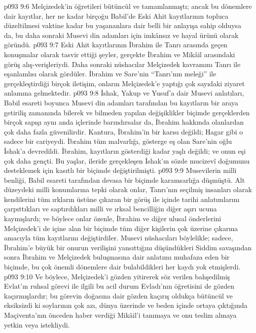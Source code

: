 \vs p093 9:6 Melçizedek’in öğretileri bütüncül ve tamamlanmıştı; ancak bu dönemlere dair kayıtlar, her ne kadar birçoğu Babil’de Eski Ahit kayıtlarının topluca düzeltilmesi vaktine kadar bu yaşananlara dair belli bir anlayışa sahip olduysa da, bu daha sonraki Musevi din adamları için imkânsız ve hayal ürünü olarak göründü.
\vs p093 9:7 Eski Ahit kayıtlarının İbrahim ile Tanrı arasında geçen konuşmalar olarak tasvir ettiği şeyler, gerçekte İbrahim ve Mikâil arasındaki görüş alış\hyp{}verişleriydi. Daha sonraki nüshacılar Melçizedek kavramını Tanrı ile eşanlamlısı olarak gördüler. İbrahim ve Sare’nin “Tanrı’nın meleği” ile gerçekleştirdiği birçok iletişim, onların Melçizedek’e yaptığı çok sayıdaki ziyaret anlamına gelmektedir.
\vs p093 9:8 İshak, Yakup ve Yusuf’a dair Musevi anlatıları, Babil esareti boyunca Musevi din adamları tarafından bu kayıtların bir araya getiriliş zamanında bilerek ve bilmeden yapılan değişiklikler biçimde gerçeklerden birçok sapışı aynı anda içlerinde barındırsalar da, İbrahim hakkında olanlardan çok daha fazla güvenilirdir. Kantura, İbrahim’in bir karısı değildi; Hagar gibi o sadece bir cariyeydi. İbrahim tüm malvarlığı, gösterge eş olan Sare’nin oğlu İshak’a devredildi. İbrahim, kayıtların gösterdiği kadar yaşlı değildi; ve onun eşi çok daha gençti. Bu yaşlar, ileride gerçekleşen İshak’ın sözde mucizevî doğumunu desteklemek için kasıtlı bir biçimde değiştirilmişti.
\vs p093 9:9 Musevilerin milli benliği, Babil esareti tarafından devasa bir biçimde karamsarlığa düşmüştü. Alt düzeydeki milli konumlarına tepki olarak onlar, Tanrı’nın seçilmiş insanları olarak kendilerini tüm ırkların üstüne çıkaran bir görüş ile içinde tarihi anlatımlarını çarpıttıkları ve saptırdıkları milli ve ırksal bencilliğin diğer aşırı ucuna kaymışlardı; ve böylece onlar özenle, İbrahim ve diğer ulusal önderlerini Melçizedek’i de içine alan bir biçimde tüm diğer kişilerin çok üzerine çıkarma amacıyla tüm kayıtlarını değiştirdiler. Musevi nüshacıları böylelikle; sadece, İbrahim’e büyük bir onurun verilişini yansıttığını düşündükleri Siddim savaşından sonra İbrahim ve Melçizedek buluşmasına dair anlatımı muhafaza eden bir biçimde, bu çok önemli dönemlere dair bulabildikleri her kaydı yok etmişlerdi.
\vs p093 9:10 Ve böylece, Melçizedek’i gözden yitirerek söz verilen bahşedilmiş Evlat’ın ruhsal görevi ile ilgili bu acil durum Evladı’nın öğretisini de gözden kaçırmışlardır; bu görevin doğasına dair gözden kaçırış oldukça bütüncül ve eksiksizdi ki soylarının çok azı, dünya üzerinde ve beden içinde ortaya çıktığında Maçiventa’nın önceden haber verdiği Mikâil’i tanımaya ve onu teslim almaya yetkin veya istekliydi.
